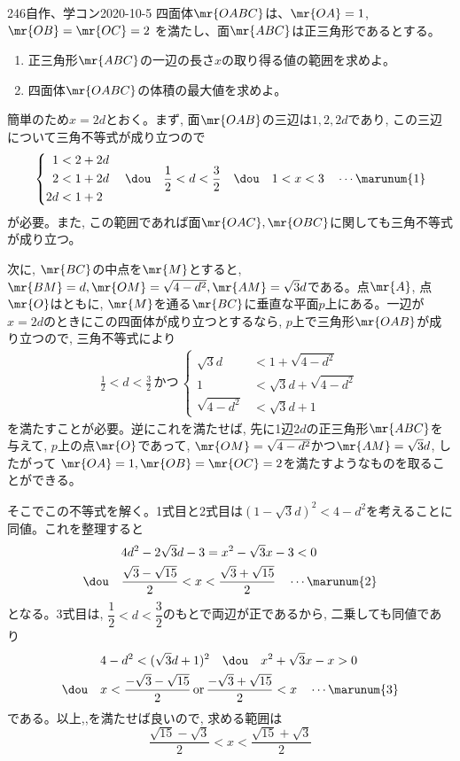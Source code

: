 \begin{thm}{246}{}{自作、学コン2020-10-5}
 四面体$\mr{OABC}$は、$\mr{OA}=1$, $\mr{OB}=\mr{OC}=2$ を満たし、面$\mr{ABC}$は正三角形であるとする。
 \begin{enumerate}
  \item 正三角形$\mr{ABC}$の一辺の長さ$x$の取り得る値の範囲を求めよ。
  \item 四面体$\mr{OABC}$の体積の最大値を求めよ。
 \end{enumerate}
\end{thm}

簡単のため$x=2d$とおく。まず, 面$\mr{OAB}$の三辺は$1,2,2d$であり, この三辺について三角不等式が成り立つので 
\begin{align*}
 \left\{
 \begin{aligned}
  1&<2+2d \\
  2&<1+2d \\
  2d&<1+2
 \end{aligned}
 \right. \quad\dou\quad \frac{1}{2}<d<\frac{3}{2} \quad\dou\quad 1<x<3 \quad \cdots\marunum{1}
\end{align*}
が必要。また, この範囲であれば面$\mr{OAC}, \mr{OBC}$に関しても三角不等式が成り立つ。

次に, $\mr{BC}$の中点を$\mr{M}$とすると, $\mr{BM}=d, \mr{OM}=\sqrt{4-d^{2}}, \mr{AM}=\sqrt{3}d$である。点$\mr{A}$, 点$\mr{O}$はともに, $\mr{M}$を通る$\mr{BC}$に垂直な平面$p$上にある。一辺が$x=2d$のときにこの四面体が成り立つとするなら, $p$上で三角形$\mr{OAB}$が成り立つので, 三角不等式により
\begin{align*}
 \frac{1}{2}<d<\frac{3}{2} \,\text{かつ}\,\left\{
 \begin{aligned}
  \sqrt{3}d&<1+\sqrt{4-d^2} \\
  1&<\sqrt{3}d+\sqrt{4-d^2} \\
  \sqrt{4-d^2}&<\sqrt{3}d+1
 \end{aligned}
 \right.
\end{align*}
を満たすことが必要。逆にこれを満たせば, 先に1辺$2d$の正三角形$\mr{ABC}$を与えて, $p$上の点$\mr{O}$であって, $\mr{OM}=\sqrt{4-d^{2}}$かつ$\mr{AM}=\sqrt{3}d$, したがって $\mr{OA}=1, \mr{OB}=\mr{OC}=2$を満たすようなものを取ることができる。

そこでこの不等式を解く。1式目と2式目は$(1-\sqrt{3}d)^{2} < 4-d^{2}$を考えることに同値。これを整理すると
\begin{align*}
 & 4d^2-2\sqrt{3}d-3=x^2-\sqrt{3}x-3 <0 \\
 \dou\quad &\frac{\sqrt{3}-\sqrt{15}}{2}<x<\frac{\sqrt{3}+\sqrt{15}}{2} \quad\cdots\marunum{2}
\end{align*}
となる。3式目は, $\dfrac{1}{2}< d < \dfrac{3}{2}$のもとで両辺が正であるから, 二乗しても同値であり
\begin{align*}
 & 4-d^2<(\sqrt{3}d+1)^2 \quad\dou\quad x^2+\sqrt{3}x-x>0 \\
 \dou\quad & x<\frac{-\sqrt{3}-\sqrt{15}}{2} \,\text{or}\, \frac{-\sqrt{3}+\sqrt{15}}{2} < x \quad\cdots\marunum{3}
\end{align*}
である。以上,,を満たせば良いので, 求める範囲は
\[ \dfrac{\sqrt{15}-\sqrt{3}}{2} < x  < \dfrac{\sqrt{15}+\sqrt{3}}{2} \]

